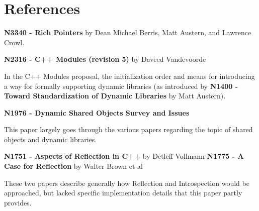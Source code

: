 \section{References}
\textbf{N3340 - Rich Pointers} by Dean Michael Berris, Matt Austern, and Lawrence Crowl.

\textbf{N2316 - C++ Modules (revision 5)} by Daveed Vandevoorde

In the C++ Modules proposal, the initialization order and means for
introducing a way for formally supporting dynamic libraries (as introduced by
\textbf{N1400 - Toward Standardization of Dynamic Libraries} by Matt Austern).

\textbf{N1976 - Dynamic Shared Objects Survey and Issues}

This paper largely goes through the various papers regarding the topic of
shared objects and dynamic libraries.

\textbf{N1751 - Aspects of Reflection in C++} by Detleff Vollmann
\textbf{N1775 - A Case for Reflection} by Walter Brown et al

These two papers describe generally how Reflection and Introspection would be
approached, but lacked specific implementation details that this paper partly
provides.
